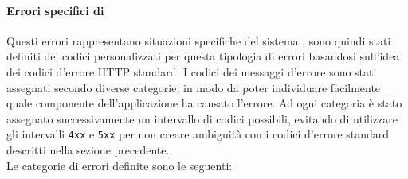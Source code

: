 \paragraph{Errori specifici di \progetto}
Questi errori rappresentano situazioni specifiche del sistema \progetto, sono quindi stati definiti dei codici personalizzati per questa tipologia di errori basandosi sull'idea dei codici d'errore HTTP standard. I codici dei messaggi d'errore sono stati assegnati secondo diverse categorie, in modo da poter individuare facilmente quale componente dell'applicazione ha causato l'errore. Ad ogni categoria è stato assegnato successivamente un intervallo di codici possibili, evitando di utilizzare gli intervalli \texttt{4xx} e \texttt{5xx} per non creare ambiguità con i codici d'errore standard descritti nella sezione precedente. \\
Le categorie di errori definite sono le seguenti:
